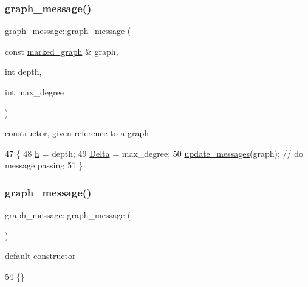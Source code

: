 \subsubsection{\texorpdfstring{graph\+\_\+message()}{graph\_message()}\hspace{0.1cm}{\footnotesize\ttfamily [1/2]}}
{\footnotesize\ttfamily graph\+\_\+message\+::graph\+\_\+message (\begin{DoxyParamCaption}\item[{const \hyperlink{classmarked__graph}{marked\+\_\+graph} \&}]{graph,  }\item[{int}]{depth,  }\item[{int}]{max\+\_\+degree }\end{DoxyParamCaption})\hspace{0.3cm}{\ttfamily [inline]}}



constructor, given reference to a graph 


\begin{DoxyCode}
47                                                                      \{
48     \hyperlink{classgraph__message_a934d63ed7275c211e13c6fb68824ed46}{h} = depth;
49     \hyperlink{classgraph__message_a45dfd061b7bc73572e5132fbf66efd55}{Delta} = max\_degree;
50     \hyperlink{classgraph__message_a40dadc59d582b290202e79bc4a9e896c}{update\_messages}(graph); \textcolor{comment}{// do message passing}
51   \}
\end{DoxyCode}
\mbox{\label{classgraph__message_aa21140453eb0e1de98a2ddfcf2832aeb}} 
\subsubsection{\texorpdfstring{graph\+\_\+message()}{graph\_message()}\hspace{0.1cm}{\footnotesize\ttfamily [2/2]}}
{\footnotesize\ttfamily graph\+\_\+message\+::graph\+\_\+message (\begin{DoxyParamCaption}{ }\end{DoxyParamCaption})\hspace{0.3cm}{\ttfamily [inline]}}



default constructor 


\begin{DoxyCode}
54 \{\}
\end{DoxyCode}


